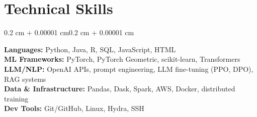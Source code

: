 \documentclass[10pt, letterpaper]{article}
\newenvironment{highlights}{
    \begin{itemize}[
        topsep=0.10 cm,
        parsep=0.10 cm,
        partopsep=0pt,
        itemsep=0pt,
        leftmargin=0.4 cm + 10pt
    ]
}{\end{itemize}}
\newenvironment{onecolentry}{
    \begin{adjustwidth}{0.2 cm + 0.00001 cm}{0.2 cm + 0.00001 cm}
}{\end{adjustwidth}}
\begin{document}




    \section{Technical Skills}

\begin{onecolentry}
    \textbf{Languages:} Python, Java, R, SQL, JavaScript, HTML\\[3pt]
    \textbf{ML Frameworks:} PyTorch, PyTorch Geometric, scikit-learn, Transformers\\[3pt]
    \textbf{LLM/NLP:} OpenAI APIs, prompt engineering, LLM fine-tuning (PPO, DPO), RAG systems\\[3pt]
    \textbf{Data \& Infrastructure:} Pandas, Dask, Spark, AWS, Docker, distributed training\\[3pt]
    \textbf{Dev Tools:} Git/GitHub, Linux, Hydra, SSH
\end{onecolentry}
\end{document}
